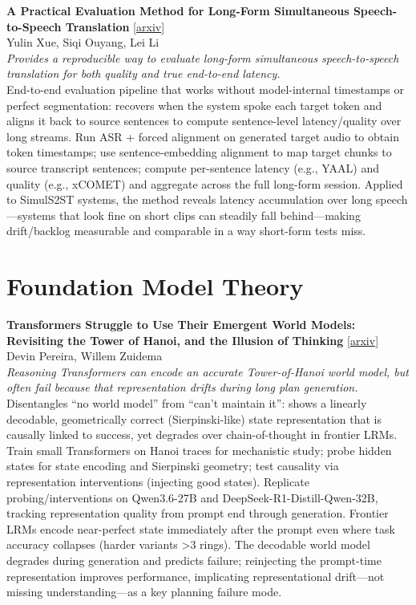 \documentclass[12pt,letterpaper]{article}
\begin{document}
\medskip

{\small\textbf{A Practical Evaluation Method for Long-Form Simultaneous Speech-to-Speech Translation}} {\scriptsize[\href{https://arxiv.org/abs/2606.15059}{arxiv}]}\\
{\scriptsize Yulin Xue, Siqi Ouyang, Lei Li}\\

{\small\textit{Provides a reproducible way to evaluate long-form simultaneous speech-to-speech translation for both quality and true end-to-end latency.}}\\[1pt]
{\footnotesize End-to-end evaluation pipeline that works without model-internal timestamps or perfect segmentation: recovers when the system spoke each target token and aligns it back to source sentences to compute sentence-level latency/quality over long streams. Run ASR + forced alignment on generated target audio to obtain token timestamps; use sentence-embedding alignment to map target chunks to source transcript sentences; compute per-sentence latency (e.g., YAAL) and quality (e.g., xCOMET) and aggregate across the full long-form session. Applied to SimulS2ST systems, the method reveals latency accumulation over long speech---systems that look fine on short clips can steadily fall behind---making drift/backlog measurable and comparable in a way short-form tests miss.}

\medskip


\section*{Foundation Model Theory}

{\small\textbf{Transformers Struggle to Use Their Emergent World Models: Revisiting the Tower of Hanoi, and the Illusion of Thinking}} {\scriptsize[\href{https://arxiv.org/abs/2608.07077}{arxiv}]}\\
{\scriptsize Devin Pereira, Willem Zuidema}\\

{\small\textit{Reasoning Transformers can encode an accurate Tower-of-Hanoi world model, but often fail because that representation drifts during long plan generation.}}\\[1pt]
{\footnotesize Disentangles ``no world model'' from ``can't maintain it'': shows a linearly decodable, geometrically correct (Sierpinski-like) state representation that is causally linked to success, yet degrades over chain-of-thought in frontier LRMs. Train small Transformers on Hanoi traces for mechanistic study; probe hidden states for state encoding and Sierpinski geometry; test causality via representation interventions (injecting good states). Replicate probing/interventions on Qwen3.6-27B and DeepSeek-R1-Distill-Qwen-32B, tracking representation quality from prompt end through generation. Frontier LRMs encode near-perfect state immediately after the prompt even where task accuracy collapses (harder variants >3 rings). The decodable world model degrades during generation and predicts failure; reinjecting the prompt-time representation improves performance, implicating representational drift---not missing understanding---as a key planning failure mode.}
\end{document}
